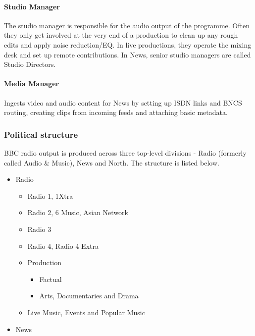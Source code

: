 \paragraph{Studio Manager}
The studio manager is responsible for the audio output of the programme. Often
they only get involved at the very end of a production to clean up any rough
edits and apply noise reduction/EQ. In live productions, they operate the
mixing desk and set up remote contributions. In News, senior studio managers
are called Studio Directors.



\paragraph{Media Manager}
Ingests video and audio content for News by setting up ISDN links and BNCS
routing, creating clips from incoming feeds and attaching basic metadata.

\subsubsection{Political structure}\label{sec:organisation}
BBC radio output is produced across three top-level divisions - Radio (formerly
called Audio \& Music), News and North. The structure is listed below.

\begin{itemize}
  \item Radio
  \begin{itemize}
    \item Radio 1, 1Xtra
    \item Radio 2, 6 Music, Asian Network
    \item Radio 3
    \item Radio 4, Radio 4 Extra
    \item Production
    \begin{itemize}
      \item Factual
      \item Arts, Documentaries and Drama
    \end{itemize}
    \item Live Music, Events and Popular Music
  \end{itemize}
  \item News
\end{itemize}

